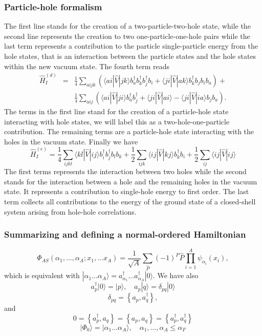 \documentclass{beamer}
\begin{document}
\begin{frame}
\frametitle{Particle-hole formalism}

\begin{block}{}
The first line stands for the creation of a two-particle-two-hole state, while the second line represents
the creation to two one-particle-one-hole pairs
while the last term represents a contribution to the particle single-particle energy
from the hole states, that is an interaction between the particle states and the hole states
within the new vacuum  state.
The fourth term reads
\begin{eqnarray}
	 \hat{H}_I^{(d)}& = &\frac{1}{4} 
	 	\sum_{aijk}\left(\langle ai|\hat{V}|jk\rangle b_a^\dagger b_k^\dagger b_j^\dagger b_i+
\langle ji|\hat{V}|ak\rangle b_k^\dagger b_j b_i b_a\right)+\nonumber \\
&&\frac{1}{4}\sum_{aij}\left(\langle ai|\hat{V}|ji\rangle b_a^\dagger b_j^\dagger+
\langle ji|\hat{V}|ai\rangle - \langle ji|\hat{V}|ia\rangle b_j b_a \right). \label{eq:2-69d} 
\end{eqnarray}
The terms in the first line  stand for the creation of a particle-hole state 
interacting with hole states, we will label this as a two-hole-one-particle contribution. 
The remaining terms are a particle-hole state interacting with the holes in the vacuum state. 
Finally we have 
\begin{equation}
	\hat{H}_I^{(e)} = \frac{1}{4}
		 \sum_{ijkl}
		 \langle kl|\hat{V}|ij\rangle b_i^\dagger b_j^\dagger b_l b_k+
	        \frac{1}{2}\sum_{ijk}\langle ij|\hat{V}|kj\rangle b_k^\dagger b_i
	        +\frac{1}{2}\sum_{ij}\langle ij|\hat{V}|ij\rangle \label{eq:2-70d}
\end{equation}
The first terms represents the 
interaction between two holes while the second stands for the interaction between a hole and the remaining holes in the vacuum state.
It represents a contribution to single-hole energy  to first order.
The last term collects all contributions to the energy of the ground state of a closed-shell system arising
from hole-hole correlations.
\end{block}
\end{frame}

\begin{frame}
\frametitle{Summarizing and defining a normal-ordered Hamiltonian}

\begin{block}{}
\[
  \Phi_{AS}(\alpha_1, \dots, \alpha_A; x_1, \dots x_A)=
            \frac{1}{\sqrt{A}} \sum_{\hat{P}} (-1)^P \hat{P} \prod_{i=1}^A \psi_{\alpha_i}(x_i),
\]
which is equivalent with $|\alpha_1 \dots \alpha_A\rangle= a_{\alpha_1}^{\dagger} \dots a_{\alpha_A}^{\dagger} |0\rangle$. We have also
    \[
        a_p^\dagger|0\rangle = |p\rangle, \quad a_p |q\rangle = \delta_{pq}|0\rangle
    \]
\[
  \delta_{pq} = \left\{a_p, a_q^\dagger \right\},
\]
and 
\[
0 = \left\{a_p^\dagger, a_q \right\} = \left\{a_p, a_q \right\} = \left\{a_p^\dagger, a_q^\dagger \right\}
\]
\[
|\Phi_0\rangle = |\alpha_1 \dots \alpha_A\rangle, \quad \alpha_1, \dots, \alpha_A \leq \alpha_F
\]
\end{block}
\end{frame}
\end{document}
